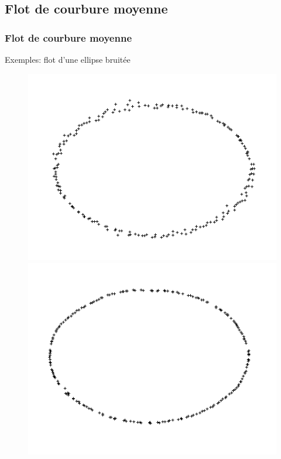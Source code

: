 \documentclass{beamer}
\begin{document}
\subsection{Flot de courbure moyenne}
\begin{frame}
    \frametitle{Flot de courbure moyenne}

    Exemples: flot d'une ellipse bruitée
    \begin{figure}
        \centering
        \includegraphics[scale=0.22]{img/ellipse-200-noised-var-1-area}
        \includegraphics[scale=0.22]{img/ellipse-noised-area-5-01}


\end{figure}
\end{frame}
\end{document}
